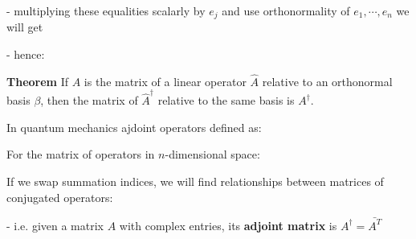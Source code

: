 \documentclass{article}
\begin{document}
- multiplying these equalities scalarly by $e_j$ and use orthonormality of $e_1, \cdots , e_n$ we will get


- hence:





\textbf{Theorem} If $A$ is the matrix of a linear operator $\hat{A}$ relative to an orthonormal basis $\beta$, then the matrix of $\hat{A}^\dag$ relative to the same basis is $A^\dag$.



In quantum mechanics ajdoint operators defined as:



For the matrix of operators in $n$-dimensional space:



If we swap summation indices, we will find relationships between matrices of conjugated operators:


- i.e. given a matrix $A$ with complex entries, its \textbf{adjoint matrix} is $A^\dag = \bar{A^{T}}$
\end{document}
